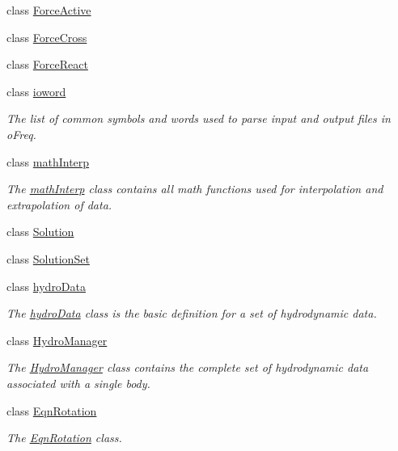 \begin{DoxyCompactItemize}
\item 
class \hyperlink{classosea_1_1ofreq_1_1_force_active}{Force\-Active}
\item 
class \hyperlink{classosea_1_1ofreq_1_1_force_cross}{Force\-Cross}
\item 
class \hyperlink{classosea_1_1ofreq_1_1_force_react}{Force\-React}
\item 
class \hyperlink{classosea_1_1ofreq_1_1ioword}{ioword}
\begin{DoxyCompactList}\small\item\em The list of common symbols and words used to parse input and output files in o\-Freq. \end{DoxyCompactList}\item 
class \hyperlink{classosea_1_1ofreq_1_1math_interp}{math\-Interp}
\begin{DoxyCompactList}\small\item\em The \hyperlink{classosea_1_1ofreq_1_1math_interp}{math\-Interp} class contains all math functions used for interpolation and extrapolation of data. \end{DoxyCompactList}\item 
class \hyperlink{classosea_1_1ofreq_1_1_solution}{Solution}
\item 
class \hyperlink{classosea_1_1ofreq_1_1_solution_set}{Solution\-Set}
\item 
class \hyperlink{classosea_1_1ofreq_1_1hydro_data}{hydro\-Data}
\begin{DoxyCompactList}\small\item\em The \hyperlink{classosea_1_1ofreq_1_1hydro_data}{hydro\-Data} class is the basic definition for a set of hydrodynamic data. \end{DoxyCompactList}\item 
class \hyperlink{classosea_1_1ofreq_1_1_hydro_manager}{Hydro\-Manager}
\begin{DoxyCompactList}\small\item\em The \hyperlink{classosea_1_1ofreq_1_1_hydro_manager}{Hydro\-Manager} class contains the complete set of hydrodynamic data associated with a single body. \end{DoxyCompactList}\item 
class \hyperlink{classosea_1_1ofreq_1_1_eqn_rotation}{Eqn\-Rotation}
\begin{DoxyCompactList}\small\item\em The \hyperlink{classosea_1_1ofreq_1_1_eqn_rotation}{Eqn\-Rotation} class. \end{DoxyCompactList}\item 

\end{DoxyCompactItemize}
